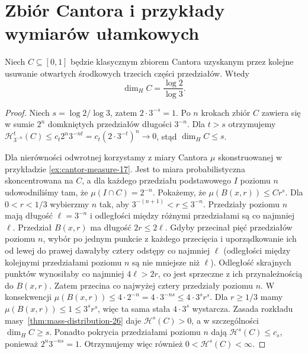 \section{Zbiór Cantora i przykłady wymiarów ułamkowych}
\begin{twierdzenie}
\label{thm:cantor-dimension-26}
Niech $C\subseteq[0,1]$ będzie klasycznym zbiorem
Cantora uzyskanym przez kolejne usuwanie otwartych
środkowych trzecich części przedziałów. Wtedy
\[
 \dim_HC=\frac{\log2}{\log3}.
\]
\end{twierdzenie}
\begin{proof}
Niech $s=\log2/\log3$, zatem $2\cdot3^{-s}=1$.
Po $n$ krokach zbiór $C$ zawiera się w sumie
$2^n$ domkniętych przedziałów długości $3^{-n}$.
Dla $t>s$ otrzymujemy
$\mathcal H^t_{3^{-n}}(C)\le
c_t2^n3^{-nt}=c_t(2\cdot3^{-t})^n\to0$,
stąd $\dim_HC\le s$.

Dla nierówności odwrotnej korzystamy z miary Cantora
$\mu$ skonstruowanej w przykładzie \ref{ex:cantor-measure-17}.
Jest to miara probabilistyczna skoncentrowana na $C$,
a dla każdego przedziału podstawowego $I$ poziomu $n$
udowodniliśmy tam, że $\mu(I\cap C)=2^{-n}$.
Pokażemy, że $\mu(B(x,r))\le Cr^s$.
Dla $0<r<1/3$ wybierzmy $n$ tak, aby
$3^{-(n+1)}<r\le3^{-n}$. Przedziały poziomu $n$
mają długość $\ell=3^{-n}$ i odległości między
różnymi przedziałami są co najmniej $\ell$.
Przedział $B(x,r)$ ma długość $2r\le2\ell$.
Gdyby przecinał pięć przedziałów poziomu $n$, wybór po jednym
punkcie z każdego przecięcia i uporządkowanie ich od lewej do prawej
dawałyby cztery odstępy co najmniej $\ell$ (odległości między
kolejnymi przedziałami poziomu $n$ są nie mniejsze niż $\ell$).
Odległość skrajnych punktów wynosiłaby co najmniej $4\ell>2r$,
co jest sprzeczne z ich przynależnością do $B(x,r)$.
Zatem przecina co najwyżej cztery przedziały poziomu $n$.
W konsekwencji
$\mu(B(x,r))\le4\cdot2^{-n}
=4\cdot3^{-ns}\le4\cdot3^sr^s$.
Dla $r\ge1/3$ mamy $\mu(B(x,r))\le1\le3^sr^s$,
więc ta sama stała $4\cdot3^s$ wystarcza.
Zasada rozkładu masy~\ref{thm:mass-distribution-26}
daje $\mathcal H^s(C)>0$, a w szczególności
$\dim_HC\ge s$. Ponadto pokrycia przedziałami
poziomu $n$ dają $\mathcal H^s(C)\le c_s$, ponieważ
$2^n3^{-ns}=1$. Otrzymujemy więc również
$0<\mathcal H^s(C)<\infty$.
\end{proof}

